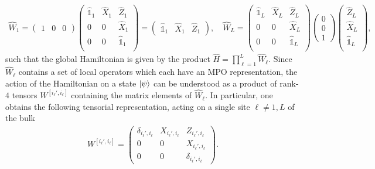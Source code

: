 \begin{align}
    \hat W_1 =
    \begin{pmatrix}
        1 & 0 & 0
    \end{pmatrix}
    \begin{pmatrix}
        \hat{\mathbb 1}_1 & \hat X_1 & \hat Z_1\\
        0 & 0 & \hat X_1\\
        0 & 0 & \hat{\mathbb 1}_1\\
    \end{pmatrix}
    =
    \begin{pmatrix}
        \hat{\mathbb 1}_1 & \hat X_1 & \hat Z_1
    \end{pmatrix}
    ,
    \quad
    \hat W_L =
    \begin{pmatrix}
        \hat{\mathbb 1}_L & \hat X_L & \hat Z_L\\
        0 & 0 & \hat X_L\\
        0 & 0 & \hat{\mathbb 1}_L\\
    \end{pmatrix}
    \begin{pmatrix}
        0 \\ 0 \\ 1
    \end{pmatrix}
    \begin{pmatrix}
        \hat Z_L\\
        \hat X_L\\
        \hat{\mathbb 1}_L\\
    \end{pmatrix},
    \label{eq:boundary_W}
\end{align}
such that the global Hamiltonian is given by the product $\hat H = \prod_{\ell=1}^{L}\hat W_{\ell}$.
Since $\hat W_\ell$ contains a set of local operators which each have an MPO representation, the action of the Hamiltonian on a state $\ket\psi$ can be understood as a product of rank-$4$ tensors $W^{[i_\ell',i_\ell]}$ containing the matrix elements of $\hat W_{\ell}$.
In particular, one obtains the following tensorial representation, acting on a single site $\ell\neq1,L$ of the bulk
\begin{align}
    W^{[i_\ell',i_\ell]} =
    \begin{pmatrix}
        \delta_{i_\ell',i_\ell} & X_{i_\ell',i_\ell} & Z_{i_\ell',i_\ell} \\
        0 & 0 & X_{i_\ell',i_\ell} \\
        0 & 0 & \delta_{i_\ell',i_\ell}
    \end{pmatrix}
    .
\end{align}
